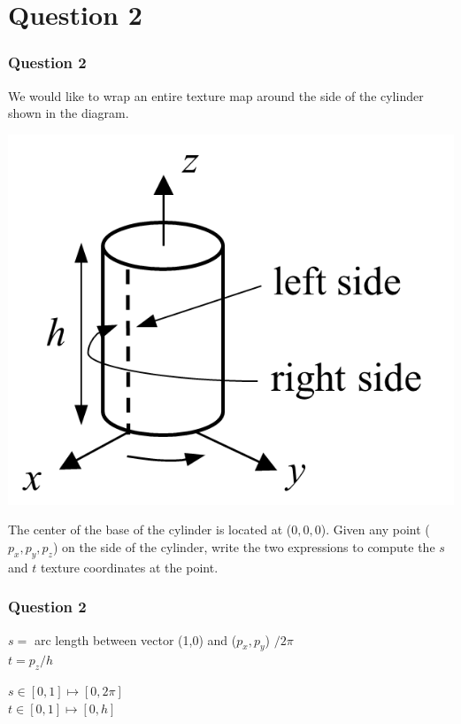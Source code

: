 \documentclass{beamer}
\begin{document}
\section{Question 2}

\begin{frame}
    \frametitle{Question 2}
    We would like to wrap an entire texture map around the side of the cylinder shown in the diagram. 

    \begin{center}
        \includegraphics[scale=0.7]{q2.png}
    \end{center}
    
    The center of the base of the cylinder is located at ($0, 0, 0$). 
    Given any point ($p_x, p_y, p_z$) on the side of the cylinder, 
    write the two expressions to compute the $s$ and $t$ texture coordinates at the point. 
    

\end{frame}

\begin{frame}
    \frametitle{Question 2}

    \begin{tcolorbox}
        $s = $ arc length between vector (1,0) and ($p_x, p_y$) $/ 2\pi$ \\
        $t = p_z / h$
    \end{tcolorbox}

    $s \in [0, 1] \mapsto [0, 2\pi]$\\
    $t \in [0, 1] \mapsto [0, h]$\\

\end{frame}
\end{document}
